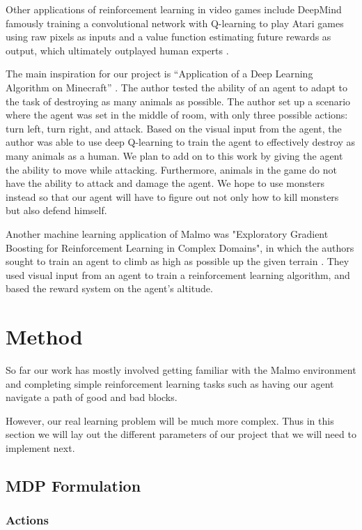 \documentclass{article}
\begin{document}
Other applications of reinforcement learning in video games include DeepMind famously training a convolutional network with Q-learning to play Atari games using raw pixels as inputs and a value function estimating future rewards as output, which ultimately outplayed human experts \cite{deepMind}.

The main inspiration for our project is “Application of a Deep Learning Algorithm on Minecraft” \cite{vandegoor}. The author tested the ability of an agent to adapt to the task of destroying as many animals as possible. The author set up a scenario where the agent was set in the middle of room, with only three possible actions: turn left, turn right, and attack. Based on the visual input from the agent, the author was able to use deep Q-learning to train the agent to effectively destroy as many animals as a human. We plan to add on to this work by giving the agent the ability to move while attacking. Furthermore, animals in the game do not have the ability to attack and damage the agent. We hope to use monsters instead so that our agent will have to figure out not only how to kill monsters but also defend himself.

Another machine learning application of Malmo was "Exploratory Gradient Boosting for Reinforcement Learning in Complex Domains", in which the authors sought to train an agent to climb as high as possible up the given terrain \cite{abelEtal}. They used visual input from an agent to train a reinforcement learning algorithm, and based the reward system on the agent's altitude. 

\section{Method}

So far our work has  mostly involved getting familiar with the Malmo environment and completing simple  reinforcement learning tasks such as  having our agent  navigate a path of good and bad blocks.

However, our real learning problem will be much more complex. Thus in this section we will lay out the different parameters of our project that we will need to implement next.

\subsection{ MDP Formulation}

\subsubsection{ Actions}
\end{document}
